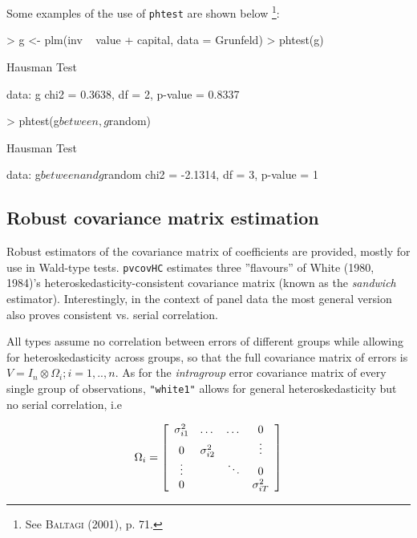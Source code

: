 \documentclass{article}
\begin{document}
Some examples of the use of \texttt{phtest} are shown below
\footnote{See \textsc{Baltagi} (2001), p. 71.}:


\begin{Schunk}
\begin{Sinput}
> g <- plm(inv ~ value + capital, data = Grunfeld)
> phtest(g)
\end{Sinput}
\begin{Soutput}
	Hausman Test

data:  g 
chi2 = 0.3638, df = 2, p-value = 0.8337
\end{Soutput}
\begin{Sinput}
> phtest(g$between, g$random)
\end{Sinput}
\begin{Soutput}
	Hausman Test

data:  g$between and g$random 
chi2 = -2.1314, df = 3, p-value = 1
\end{Soutput}
\end{Schunk}


\subsection{Robust covariance matrix estimation}
Robust estimators of the covariance matrix of coefficients are provided, mostly for use in Wald-type tests. \texttt{pvcovHC} estimates three ''flavours'' of White (1980, 1984)'s heteroskedasticity-consistent covariance matrix (known as the \emph{sandwich} estimator). Interestingly, in the context of panel data the most general version also proves consistent vs. serial correlation.

All types assume no correlation between errors of different groups while allowing for heteroskedasticity across groups, so that the full covariance matrix of errors is $  V=I_n \otimes \Omega_i;  i=1,..,n$. As for the \emph{intragroup} error covariance matrix of every single group of observations, \texttt{"white1"} allows for general heteroskedasticity but no serial correlation, i.e

\begin{equation}
 \label{eq:omegaW1}
 \Omega_i=
 \left[ \begin{array}{c c c c}
 \sigma_{i1}^2 & \dots & \dots & 0 \\
 0 & \sigma_{i2}^2 & & \vdots \\
 \vdots & & \ddots & 0 \\
 0 & & & \sigma_{iT}^2 \\
 \end{array} \right]
\end{equation}
\end{document}
